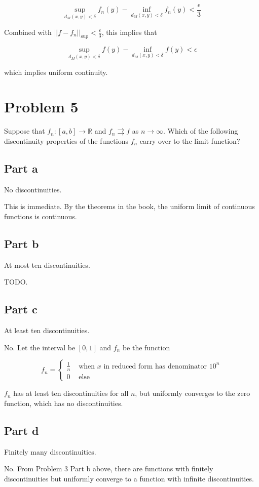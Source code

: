 \documentclass{article}
\newcommand{\R}{\mathbb{R}}
\begin{document}
\[
\sup_{d_M(x, y) < \delta} f_n(y) - \inf_{d_M(x, y) < \delta} f_n(y) < \frac{\epsilon}{3}
\]

Combined with $||f - f_n||_{\sup} < \frac{\epsilon}{3}$, this implies that

\[
\sup_{d_M(x, y) < \delta} f(y) - \inf_{d_M(x, y) < \delta} f(y) < \epsilon
\]

which implies uniform continuity.

\section*{Problem 5}

Suppose that $f_n: [a, b] \rightarrow \R$ and $f_n \rightrightarrows f$ as $n \rightarrow \infty$. Which of the following discontinuity properties of the functions $f_n$ carry over to the limit function?

\subsection*{Part a}

No discontinuities.

This is immediate. By the theorems in the book, the uniform limit of continuous functions is continuous.

\subsection*{Part b}

At most ten discontinuities.

TODO.

\subsection*{Part c}

At least ten discontinuities.

No. Let the interval be $[0, 1]$ and $f_n$ be the function

\[
f_n = 
\begin{cases}
\frac{1}{n} & \text{ when } x \text{ in reduced form has denominator } 10^n \\
0 & \text{ else}
\end{cases}
\]

$f_n$ has at least ten discontinuities for all $n$, but uniformly converges to the zero function, which has no discontinuities.

\subsection*{Part d}

Finitely many discontinuities.

No. From Problem 3 Part b above, there are functions with finitely discontinuities but uniformly converge to a function with infinite discontinuities.
\end{document}
